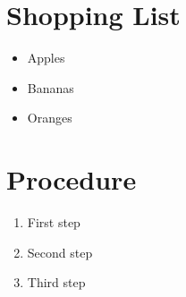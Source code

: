 \documentclass{article}
\begin{document}
\section{Shopping List}
\begin{itemize}
\item Apples
\item Bananas
\item Oranges
\end{itemize}

\section{Procedure}
\begin{enumerate}
\item First step
\item Second step
\item Third step
\end{enumerate}
\end{document}
